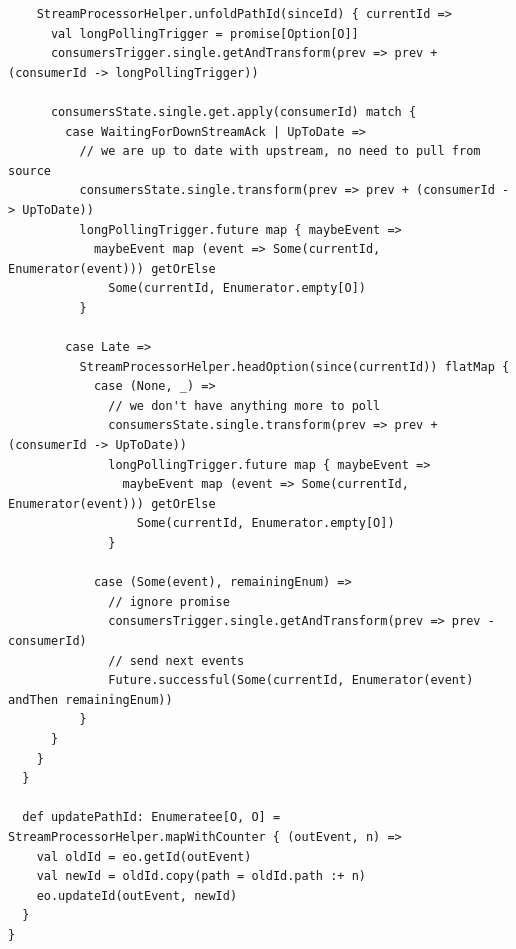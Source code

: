 \begin{verbatim}
    StreamProcessorHelper.unfoldPathId(sinceId) { currentId =>
      val longPollingTrigger = promise[Option[O]]
      consumersTrigger.single.getAndTransform(prev => prev + (consumerId -> longPollingTrigger))

      consumersState.single.get.apply(consumerId) match {
        case WaitingForDownStreamAck | UpToDate =>
          // we are up to date with upstream, no need to pull from source
          consumersState.single.transform(prev => prev + (consumerId -> UpToDate))
          longPollingTrigger.future map { maybeEvent =>
            maybeEvent map (event => Some(currentId, Enumerator(event))) getOrElse 
              Some(currentId, Enumerator.empty[O])
          }

        case Late =>
          StreamProcessorHelper.headOption(since(currentId)) flatMap {
            case (None, _) =>
              // we don't have anything more to poll
              consumersState.single.transform(prev => prev + (consumerId -> UpToDate))
              longPollingTrigger.future map { maybeEvent =>
                maybeEvent map (event => Some(currentId, Enumerator(event))) getOrElse 
                  Some(currentId, Enumerator.empty[O])
              }

            case (Some(event), remainingEnum) =>
              // ignore promise
              consumersTrigger.single.getAndTransform(prev => prev - consumerId)
              // send next events
              Future.successful(Some(currentId, Enumerator(event) andThen remainingEnum))
          }
      }
    }
  }

  def updatePathId: Enumeratee[O, O] = StreamProcessorHelper.mapWithCounter { (outEvent, n) =>
    val oldId = eo.getId(outEvent)
    val newId = oldId.copy(path = oldId.path :+ n)
    eo.updateId(outEvent, newId)
  }
}
\end{verbatim}

